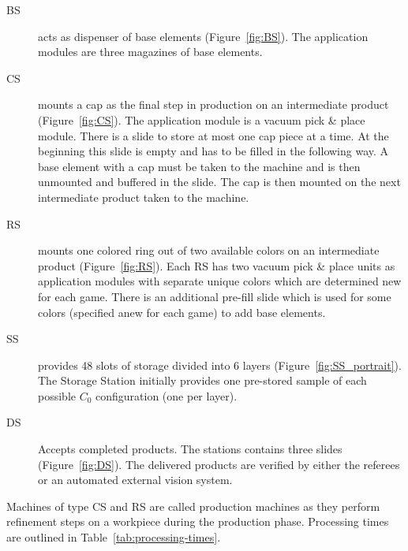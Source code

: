 \documentclass[12pt,twoside]{article}
\newcommand{\reffig}[1]{Figure~\ref{#1}}
\newcommand{\reftab}[1]{Table~\ref{#1}}
\begin{document}
\begin{description}
\item[\acf{BS}] acts as dispenser of base elements
  (\reffig{fig:BS}). The application modules are three magazines of
  base elements.

\item[\acf{CS}] mounts a cap as the final step in production
  on an intermediate product (\reffig{fig:CS}). The application module
  is a vacuum pick \& place module. There is a slide to store at most
  one cap piece at a time. At the beginning this slide is empty and
  has to be filled in the following way.  A base element with a cap
  must be taken to the machine and is then unmounted and buffered in
  the slide. The cap is then mounted on the next intermediate product
  taken to the machine.

\item[\acf{RS}] mounts one colored ring out of two available
  colors on an intermediate product (\reffig{fig:RS}). Each \ac{RS} has two
  vacuum pick \& place units as application modules with separate
  unique colors which are determined new for each game. There is an
  additional pre-fill slide which is used for some colors (specified
  anew for each game) to add base elements.

\item[\acf{SS}] provides 48 slots of storage divided into
  6 layers (\reffig{fig:SS_portrait}).
  The Storage Station initially provides one pre-stored sample of each possible
  $C_0$ configuration (one per layer).

\item[\acf{DS}] Accepts completed products. The stations contains
  three slides (\reffig{fig:DS}). The delivered products are verified by either
  the referees or an automated external vision system.
\end{description}

\noindent
Machines of type \ac{CS} and \ac{RS} are called production machines as they
perform refinement steps on a workpiece during the production
phase. Processing times are outlined in \reftab{tab:processing-times}.
\end{document}
